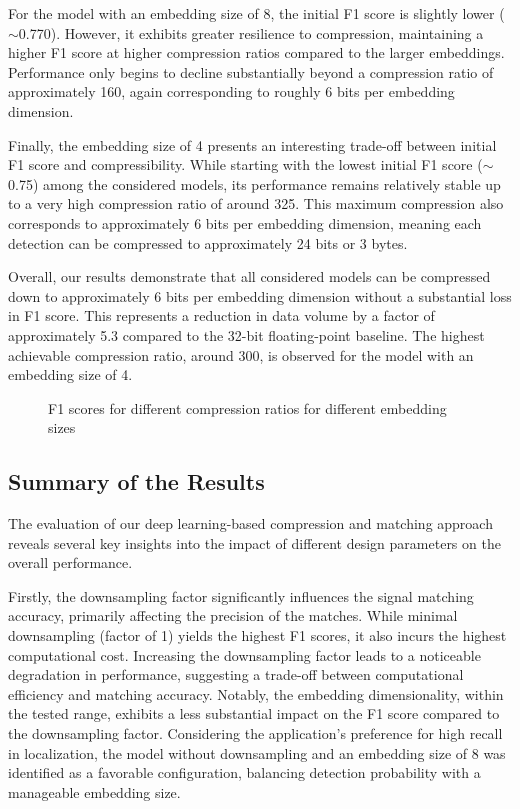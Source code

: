 \documentclass[sigconf, 10pt, nonacm, anonymous]{acmart}  %
\begin{document}
For the model with an embedding size of 8, the initial F1 score is slightly lower ($\sim$0.770). However, it exhibits greater resilience to compression, maintaining a higher F1 score at higher compression ratios compared to the larger embeddings. Performance only begins to decline substantially beyond a compression ratio of approximately 160, again corresponding to roughly 6 bits per embedding dimension.

Finally, the embedding size of 4 presents an interesting trade-off between initial F1 score and compressibility. While starting with the lowest initial F1 score ($\sim$0.75) among the considered models, its performance remains relatively stable up to a very high compression ratio of around 325. This maximum compression also corresponds to approximately 6 bits per embedding dimension, meaning each detection can be compressed to approximately 24 bits or 3 bytes.

Overall, our results demonstrate that all considered models can be compressed down to approximately 6 bits per embedding dimension without a substantial loss in F1 score. This represents a reduction in data volume by a factor of approximately 5.3 compared to the 32-bit floating-point baseline. The highest achievable compression ratio, around 300, is observed for the model with an embedding size of 4.
    
\begin{figure}
    \centering
    
    \caption{F1 scores for different compression ratios for different embedding sizes}
    \label{fig:data_compress}
\end{figure}


\subsection{Summary of the Results}
The evaluation of our deep learning-based compression and matching approach reveals several key insights into the impact of different design parameters on the overall performance.

Firstly, the downsampling factor significantly influences the signal matching accuracy, primarily affecting the precision of the matches. While minimal downsampling (factor of 1) yields the highest F1 scores, it also incurs the highest computational cost. Increasing the downsampling factor leads to a noticeable degradation in performance, suggesting a trade-off between computational efficiency and matching accuracy. Notably, the embedding dimensionality, within the tested range, exhibits a less substantial impact on the F1 score compared to the downsampling factor. Considering the application's preference for high recall in localization, the model without downsampling and an embedding size of 8 was identified as a favorable configuration, balancing detection probability with a manageable embedding size.
\end{document}
